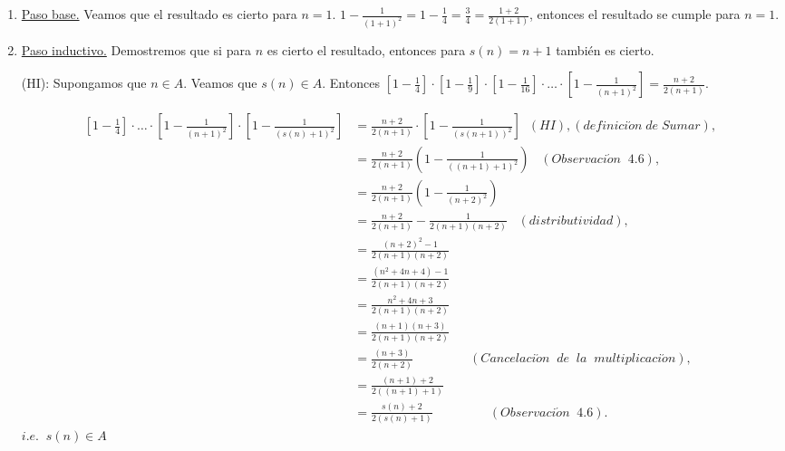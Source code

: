 \documentclass[letterpaper,11pt]{article}
\begin{document}
  \begin{adjustwidth}{0.5cm}{0cm}
    \begin{enumerate}[1.]
      \item \underline{Paso base.} Veamos que el resultado es cierto para $n = 1$. \newline
        $1 - \frac{1}{(1 + 1)^2} = 1 - \frac{1}{4} = \frac{3}{4} = \frac{1 + 2}{2(1 + 1)}$, entonces el resultado se cumple para $n = 1$.
      \item \underline{Paso inductivo.} Demostremos que si para $n$ es cierto el resultado,
       entonces para $s(n) = n + 1$ también es cierto. \newline

      (HI): Supongamos que $n \in A$. Veamos que $s(n) \in A$. \newline
      Entonces $\left [1 - \frac{1}{4} \right] \cdot \left [1 - \frac{1}{9} \right] \cdotp \left [1 - \frac{1}{16} \right] \cdot \dotsc \cdot \left [1 - \frac{1}{(n+1)^2} \right] = \frac{n + 2}{2(n + 1)}$.

      \begin{align*}
        \left [1 - \frac{1}{4} \right] \cdot \dotsc \cdot \left [1 - \frac{1}{(n+1)^2} \right] \cdot \left [1 - \frac{1}{(s(n)+1)^2} \right] &= \frac{n + 2}{2(n + 1)} \cdot \left [1 - \frac{1}{(s(n+1))^2} \right] \;\; (HI), (definici\acute{o}n \; de \; Sumar), \\
        &= \frac{n + 2}{2(n + 1)} \left (1 - \frac{1}{((n+1) + 1)^2} \right ) \;\;\; (Observaci\acute{o}n \;\; 4.6), \\
        &= \frac{n + 2}{2(n + 1)} \left (1 - \frac{1}{(n+2)^2} \right ) \\
        &= \frac{n + 2}{2(n + 1)} - \frac{1}{2(n + 1)(n+2)} \;\;\; (distributividad), \\
        &= \frac{(n+2)^2 - 1}{2(n + 1)(n+2)} \\
        &= \frac{(n^2 + 4n + 4) - 1}{2(n + 1)(n+2)} \\
        &= \frac{n^2 + 4n + 3}{2(n + 1)(n+2)} \\
        &= \frac{(n + 1) (n + 3)}{2(n + 1)(n+2)} \\
        &= \frac{(n + 3)}{2(n+2)} \;\;\;\;\;\;\;\;\;\;\;\;\;\;\;\; (Cancelaci\acute{o}n \;\; de \;\; la \;\; multiplicaci\acute{o}n), \\
        &= \frac{(n + 1) + 2}{2((n+1) + 1)} \\
        &= \frac{s(n) + 2}{2(s(n) + 1)} \;\;\;\;\;\;\;\;\;\;\;\;\;\;\;\; (Observaci\acute{o}n \;\; 4.6).
      \end{align*}
      $i.e. \;\; s(n) \in A$
    \end{enumerate}
  \end{adjustwidth}
\end{document}
